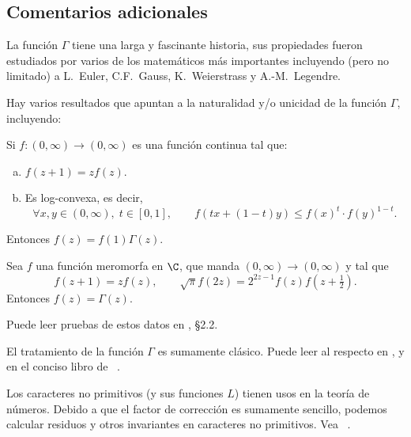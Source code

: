 \documentclass[11pt, reqno]{amsart}
\begin{document}
\begin{additional}
\appendix
\section{Comentarios adicionales}
La función $\Gamma$ tiene una larga y fascinante historia, sus propiedades fueron estudiados por varios de los matemáticos más importantes
incluyendo (pero no limitado) a L.~Euler, C.F.~Gauss, K.~Weierstrass y A.-M.~Legendre.

Hay varios resultados que apuntan a la naturalidad y/o unicidad de la función $\Gamma$, incluyendo:
\begin{thm}
	Si $f \colon (0, \infty) \to (0, \infty)$ es una función continua tal que:
	\begin{enumerate}[(a)]
		\item $f(z + 1) = zf(z)$.
		\item Es log-convexa, es decir,
			\[
				\forall x, y \in (0, \infty), \; t \in [0, 1], \qquad
				f(tx + (1 - t)y) \le f(x)^t \cdot f(y)^{1-t}.
			\]
	\end{enumerate}
	Entonces $f(z) = f(1) \Gamma(z)$.
\end{thm}
\begin{thm}
	Sea $f$ una función meromorfa en $\C$, que manda $(0, \infty) \to (0, \infty)$ y tal que
	\[
		f(z + 1) = zf(z), \qquad \sqrt{\pi} f(2z) = 2^{2z - 1}f(z) f\left( z + \tfrac{1}{2} \right).
	\]
	Entonces $f(z) = \Gamma(z)$.
\end{thm}
Puede leer pruebas de estos datos en \cite{remmert:classical}, \S 2.2.

El tratamiento de la función $\Gamma$ es sumamente clásico.
Puede leer al respecto en \cite{simon:complex}, \cite{lang:complex} y en el conciso libro de \citeauthor{artin:gamma}~\cite{artin:gamma}.

Los caracteres no primitivos (y sus funciones $L$) tienen usos en la teoría de números.
Debido a que el factor de corrección es sumamente sencillo, podemos calcular residuos y otros invariantes en caracteres no primitivos.
Vea \citeauthor{washington:cyclotomic}~\cite{washington:cyclotomic}.

\printbibliography[title={Referencias y lecturas adicionales}]
\end{additional}
\end{document}

